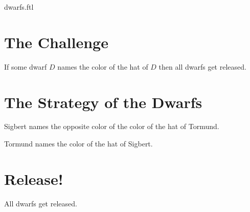 \documentclass{article}
\begin{document}
\begin{smodule}{dwarfs.ftl}
  \section{The Challenge}

  \begin{forthel}
    \begin{axiom}
      If some dwarf $D$ names the color of the hat of $D$ then all dwarfs get released.
    \end{axiom}
  \end{forthel}


  \section{The Strategy of the Dwarfs}

  \begin{forthel}
    \begin{axiom}
      Sigbert names the opposite color of the color of the hat of Tormund.
    \end{axiom}
    \begin{axiom}
      Tormund names the color of the hat of Sigbert.
    \end{axiom}
  \end{forthel}


  \section{Release!}

  \begin{forthel}
    \begin{theorem}
      All dwarfs get released.
    \end{theorem}
  \end{forthel}
\end{smodule}
\end{document}
